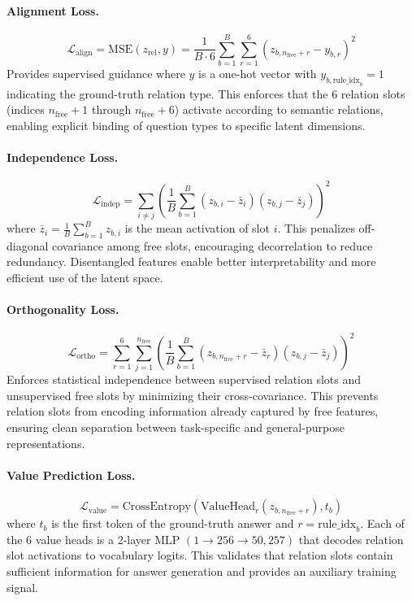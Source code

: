\paragraph{Alignment Loss.} 
\begin{equation}
\mathcal{L}_{\text{align}} = \text{MSE}(z_{\text{rel}}, y) = \frac{1}{B \cdot 6} \sum_{b=1}^{B} \sum_{r=1}^{6} (z_{b, n_{\text{free}}+r} - y_{b,r})^2
\end{equation}
Provides supervised guidance where $y$ is a one-hot vector with $y_{b,\text{rule\_idx}_b} = 1$ indicating the ground-truth relation type. This enforces that the 6 relation slots (indices $n_{\text{free}}+1$ through $n_{\text{free}}+6$) activate according to semantic relations, enabling explicit binding of question types to specific latent dimensions.

\paragraph{Independence Loss.} 
\begin{equation}
\mathcal{L}_{\text{indep}} = \sum_{i \neq j} \left( \frac{1}{B} \sum_{b=1}^{B} (z_{b,i} - \bar{z}_i)(z_{b,j} - \bar{z}_j) \right)^2
\end{equation}
where $\bar{z}_i = \frac{1}{B}\sum_{b=1}^{B} z_{b,i}$ is the mean activation of slot $i$. This penalizes off-diagonal covariance among free slots, encouraging decorrelation to reduce redundancy. Disentangled features enable better interpretability and more efficient use of the latent space.

\paragraph{Orthogonality Loss.} 
\begin{equation}
\mathcal{L}_{\text{ortho}} = \sum_{r=1}^{6} \sum_{j=1}^{n_{\text{free}}} \left( \frac{1}{B} \sum_{b=1}^{B} (z_{b,n_{\text{free}}+r} - \bar{z}_r)(z_{b,j} - \bar{z}_j) \right)^2
\end{equation}
Enforces statistical independence between supervised relation slots and unsupervised free slots by minimizing their cross-covariance. This prevents relation slots from encoding information already captured by free features, ensuring clean separation between task-specific and general-purpose representations.

\paragraph{Value Prediction Loss.} 
\begin{equation}
\mathcal{L}_{\text{value}} = \text{CrossEntropy}(\text{ValueHead}_r(z_{b,n_{\text{free}}+r}), t_b)
\end{equation}
where $t_b$ is the first token of the ground-truth answer and $r = \text{rule\_idx}_b$. Each of the 6 value heads is a 2-layer MLP $(1 \to 256 \to 50{,}257)$ that decodes relation slot activations to vocabulary logits. This validates that relation slots contain sufficient information for answer generation and provides an auxiliary training signal.

